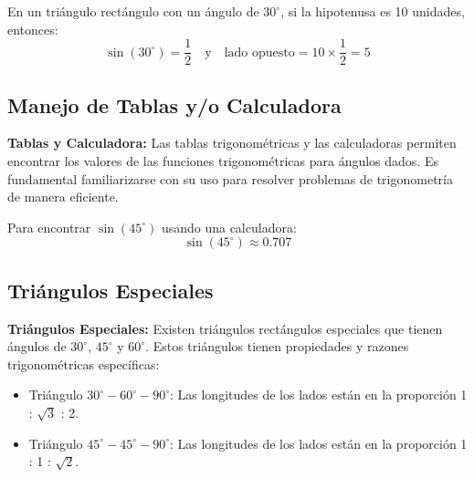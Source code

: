 \begin{example}
    En un triángulo rectángulo con un ángulo de \(30^\circ\), si la hipotenusa es 10 unidades, entonces:
    \[
    \sin(30^\circ) = \frac{1}{2} \quad \text{y} \quad \text{lado opuesto} = 10 \times \frac{1}{2} = 5
    \]
\end{example}

\subsection{Manejo de Tablas y/o Calculadora}

\begin{definition}
    \textbf{Tablas y Calculadora:} Las tablas trigonométricas y las calculadoras permiten encontrar los valores de las funciones trigonométricas para ángulos dados. Es fundamental familiarizarse con su uso para resolver problemas de trigonometría de manera eficiente.
\end{definition}

\begin{example}
    Para encontrar \(\sin(45^\circ)\) usando una calculadora:
    \[
    \sin(45^\circ) \approx 0.707
    \]
\end{example}

\subsection{Triángulos Especiales}

\begin{definition}
    \textbf{Triángulos Especiales:} Existen triángulos rectángulos especiales que tienen ángulos de \(30^\circ\), \(45^\circ\) y \(60^\circ\). Estos triángulos tienen propiedades y razones trigonométricas específicas:
    \begin{itemize}
        \item Triángulo \(30^\circ-60^\circ-90^\circ\): Las longitudes de los lados están en la proporción 1 : \(\sqrt{3}\) : 2.
        \item Triángulo \(45^\circ-45^\circ-90^\circ\): Las longitudes de los lados están en la proporción 1 : 1 : \(\sqrt{2}\).
    \end{itemize}
\end{definition}


